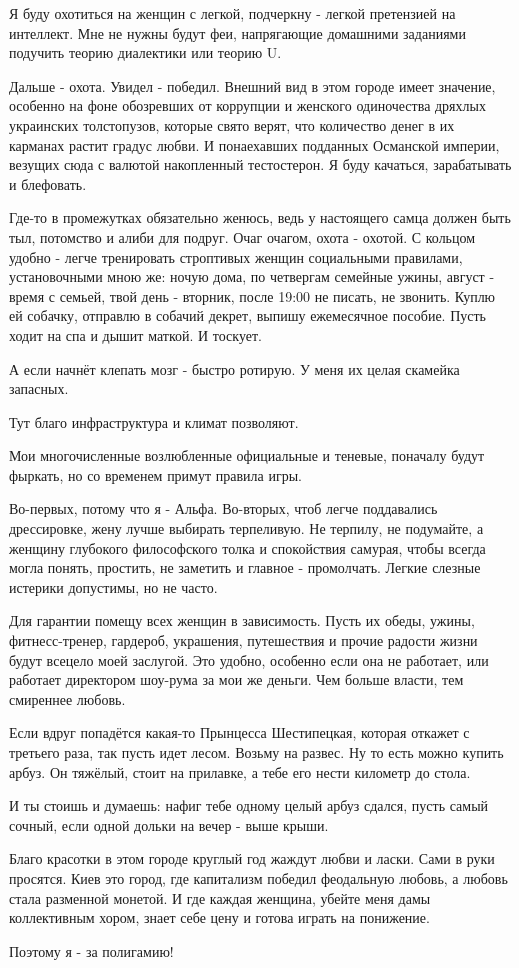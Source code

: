 Я буду охотиться на женщин с легкой, подчеркну - легкой претензией на
интеллект. Мне не нужны будут феи, напрягающие домашними заданиями подучить
теорию диалектики или теорию U.

Дальше - охота. Увидел - победил. Внешний вид в этом городе имеет значение,
особенно на фоне обозревших от коррупции и женского одиночества дряхлых
украинских толстопузов, которые свято верят, что количество денег в их карманах
растит градус любви. И понаехавших подданных Османской империи, везущих сюда с
валютой накопленный тестостерон. Я буду качаться, зарабатывать и блефовать. 

Где-то в промежутках обязательно женюсь, ведь у настоящего самца должен быть
тыл, потомство и алиби для подруг. Очаг очагом, охота - охотой. С кольцом
удобно - легче тренировать строптивых женщин социальными правилами,
установочными мною же: ночую дома, по четвергам семейные ужины, август - время
с семьей, твой день - вторник, после 19:00 не писать, не звонить. Куплю ей
собачку, отправлю в собачий декрет, выпишу ежемесячное пособие. Пусть ходит на
спа и дышит маткой. И тоскует. 

А если начнёт клепать мозг - быстро ротирую. У меня их целая скамейка запасных. 

Тут благо инфраструктура и климат позволяют. 

Мои многочисленные возлюбленные официальные и теневые, поначалу будут фыркать,
но со временем примут правила игры. 

Во-первых, потому что я - Альфа. Во-вторых, чтоб легче поддавались дрессировке,
жену лучше выбирать терпеливую. Не терпилу, не подумайте, а женщину глубокого
философского толка и спокойствия самурая, чтобы всегда могла понять, простить,
не заметить и главное - промолчать. Легкие слезные истерики допустимы, но не
часто. 

Для гарантии помещу всех женщин в зависимость. Пусть их обеды, ужины,
фитнесс-тренер, гардероб, украшения, путешествия и прочие радости жизни будут
всецело моей заслугой. Это удобно, особенно если она не работает, или работает
директором шоу-рума за мои же деньги. Чем больше власти, тем смиреннее любовь. 

Если вдруг попадётся какая-то Прынцесса Шестипецкая, которая откажет с третьего
раза, так пусть идет лесом. Возьму на развес. Ну то есть можно купить арбуз. Он
тяжёлый, стоит на прилавке, а тебе его нести километр до стола.

И ты стоишь и думаешь: нафиг тебе одному целый арбуз сдался, пусть самый
сочный, если одной дольки на вечер - выше крыши.

Благо красотки в этом городе круглый год жаждут любви и ласки. Сами в руки
просятся. Киев это город, где капитализм победил феодальную любовь, а любовь
стала разменной монетой. И где каждая женщина, убейте меня дамы коллективным
хором, знает себе цену и готова играть на понижение. 

Поэтому я - за полигамию! 
